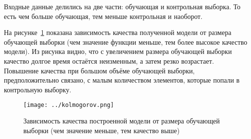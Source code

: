 \documentclass[12pt,a4paper,oneside]{extarticle}
\begin{document}
    Входные данные делились на две части: обучающая и контрольная выборка. То есть чем больше обучающая, тем меньше контрольная и наоборот.

    На рисунке~\ref{pic:test} показана зависимость качества полученной модели от размера обучающей выборки (чем значение функции меньше, тем более высокое качество модели). Из рисунка видно, что с увеличением размера обучающей выборки качество долгое время остаётся неизменным, а затем резко возрастает. Повышение качества при большом объёме обучающей выборки, предположительно связано, с малым количеством элементов, которые попали в контрольную выборку.

    \begin{figure}[h!]
        \center
        \texttt{[image: ../kolmogorov.png]}
        \caption{Зависимость качества построенной модели от размера обучающей выборки (чем значение меньше, тем качество выше)}
        \label{pic:test}
    \end{figure}
\end{document}
